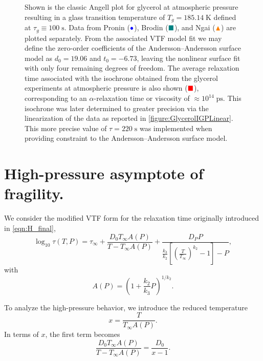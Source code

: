\begin{figure}[H]
	\caption{Shown is the classic Angell plot for glycerol at atmospheric pressure resulting in a glass transition temperature of $T_g=185.14\;\si{\kelvin}$ defined at $\tau_g\equiv 100\;\si{\second}$. Data from Pronin ($\color{blue}\bullet$), Brodin ($\color{teal}\blacksquare$), and Ngai ($\color{orange}\blacktriangle$) are plotted separately. From the associated VTF model fit we may define the zero-order coefficients of the Andersson--Andersson surface model as $d_0=19.06$ and $t_0=-6.73$, leaving the nonlinear surface fit with only four remaining degrees of freedom. The average relaxation time associated with the isochrone obtained from the glycerol \tgp experiments at atmospheric pressure is also shown ($\color{red}\blacksquare$), corresponding to an $\alpha$-relaxation time or viscosity of $\approx10^{14}\;\si{\pico\second}$. This \tgp isochrone was later determined to greater precision via the linearization of the \tgp data as reported in \fig\ref{figure:GlycerolIGPLinear}. This more precise value of $\tau=220\;\si{\second}$ was implemented when providing constraint to the Andersson--Andersson surface model.}
	\label{figure:1barglycerol}
\end{figure}

\chapter{High-pressure asymptote of fragility.}
\label{sec:asymptote}
\noindent We consider the modified VTF form for the relaxation time originally introduced in \eqn \ref{eqn:H_final},
\begin{equation}
	\label{eq:modifiedVTF_general}
	\log_{10}\tau(T,P)
	=
	\tau_{\infty}
	+
	\frac{D_0 T_{\infty} A(P)}{T - T_{\infty} A(P)}
	+
	\frac{D_P P}{
		\frac{k_3}{k_2}\left[\left(\frac{T}{T_{\infty}}\right)^{k_2} - 1\right] - P
	},
\end{equation}
with
\begin{equation}
	A(P) = \left(1 + \frac{k_2}{k_3}P\right)^{1/k_2}.
\end{equation}

\noindent To analyze the high-pressure behavior, we introduce the reduced temperature
\begin{equation}
	x = \frac{T}{T_{\infty}A(P)}.
\end{equation}
In terms of $x$, the first term becomes
\begin{equation}
	\frac{D_0 T_{\infty} A(P)}{T - T_{\infty} A(P)} = \frac{D_0}{x - 1}.
\end{equation}

